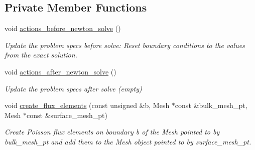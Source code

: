 \subsection*{Private Member Functions}
\begin{DoxyCompactItemize}
\item 
void \hyperlink{classTwoMeshFluxPoissonProblem_a520768a954d00d3972115ccf0b304854}{actions\+\_\+before\+\_\+newton\+\_\+solve} ()
\begin{DoxyCompactList}\small\item\em Update the problem specs before solve\+: Reset boundary conditions to the values from the exact solution. \end{DoxyCompactList}\item 
void \hyperlink{classTwoMeshFluxPoissonProblem_a9b3da753ba1d924b920e2e67779e7453}{actions\+\_\+after\+\_\+newton\+\_\+solve} ()
\begin{DoxyCompactList}\small\item\em Update the problem specs after solve (empty) \end{DoxyCompactList}\item 
void \hyperlink{classTwoMeshFluxPoissonProblem_a6729e6d9cf920e0880603fa9920ab28c}{create\+\_\+flux\+\_\+elements} (const unsigned \&b, Mesh $\ast$const \&bulk\+\_\+mesh\+\_\+pt, Mesh $\ast$const \&surface\+\_\+mesh\+\_\+pt)
\begin{DoxyCompactList}\small\item\em Create Poisson flux elements on boundary b of the Mesh pointed to by bulk\+\_\+mesh\+\_\+pt and add them to the Mesh object pointed to by surface\+\_\+mesh\+\_\+pt. \end{DoxyCompactList}\end{DoxyCompactItemize}
